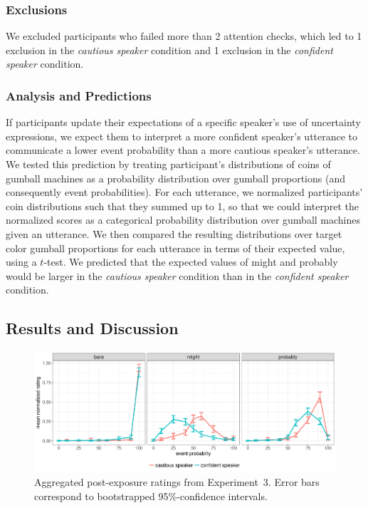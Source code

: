 \documentclass[man, floatsintext]{apa6}
\begin{document}
\subsubsection{Exclusions}

We excluded participants who failed more than 2 attention checks, which led to 1 exclusion in the \emph{cautious speaker} condition and 1 exclusion in the \emph{confident speaker} condition.


\subsubsection{Analysis and Predictions}

If participants update their expectations of a specific speaker's use of uncertainty expressions,  we expect them to interpret a more confident speaker's utterance 
to communicate a lower event probability than a more cautious speaker's utterance. We tested this prediction by treating participant's distributions of coins 
of gumball machines as a probability distribution over gumball proportions (and consequently event probabilities).  For each utterance, we 
normalized participants' coin distributions such that they summed up to 1, so that we could interpret the normalized scores 
as a categorical probability distribution over gumball machines given an utterance. We then compared the resulting distributions
over target color gumball proportions for each utterance in terms of their expected value, using a $t$-test.
 We predicted that the expected values of 
{\sc might} and {\sc probably} would be larger in the \emph{cautious speaker} condition than in the \emph{confident speaker} condition.

\subsection{Results and Discussion}

\begin{figure}
\includegraphics[width=\textwidth]{plots/exp-2-ratings.pdf}
\caption{Aggregated post-exposure ratings from Experiment~3. Error bars correspond to bootstrapped 95\%-confidence intervals.  \label{fig:adaptation-results-comp}}
\end{figure}
\end{document}
